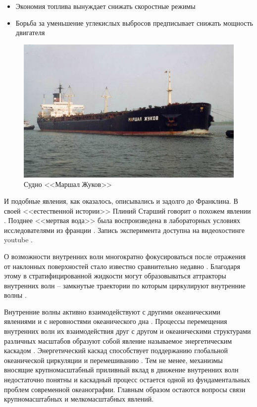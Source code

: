 \begin{itemize}
    \item Экономия топлива вынуждает снижать скоростные режимы
    \item Борьба за уменьшение углекислых выбросов предписывает снижать мощность двигателя
\end{itemize}


\begin{figure}
    \centering
    \includegraphics[scale=0.5]{Figs/marshl_jukov.jpg}
    \caption{Судно <<Маршал Жуков>>}
    \label{fig:jukov}
\end{figure}

И подобные явления, как оказалось, описывались и задолго до Франклина. В своей <<естественной истории>> Плиний Старший говорит о похожем явлении \cite{Plinii}. Позднее <<мертвая вода>> была воспроизведена в лабораторных условиях исследователями из франции \cite{deadWater}. Запись эксперимента доступна на видеохостинге youtube \cite{deadWaterVideo}.

О возможности внутренних волн многократно фокусироваться после отражения от наклонных поверхностей стало известно сравнительно недавно \cite{Gardner1989}. Благодаря этому в стратифицированной жидкости могут образовываться аттракторы внутренних волн -- замкнутые траектории по которым циркулируют внутренние волны \cite{Maas1995}.

Внутренние волны активно взаимодействуют с другими океаническими явлениями \cite{Rainville2006} и с неровностями океанического дна \cite{DAUXOIS1999}. Процессы перемещения внутренних волн их взаимодействия друг с другом и океаническими структурами различных масштабов образуют собой явление называемое энергетическим каскадом \cite{Garrett1972}. Энергетический каскад способствует поддержанию глобальной океанической циркуляции и перемешиванию \cite{Nikurashin2012,Munk1998}. Тем не менее, механизмы вносящие крупномасштабный приливный вклад в движение внутренних волн недостаточно понятны \cite{Ivey2008,Polzin1997} и каскадный процесс остается одной из фундаментальных проблем современной океанографии. Главным образом остаются вопросы связи крупномасштабных и мелкомасштабных явлений.

